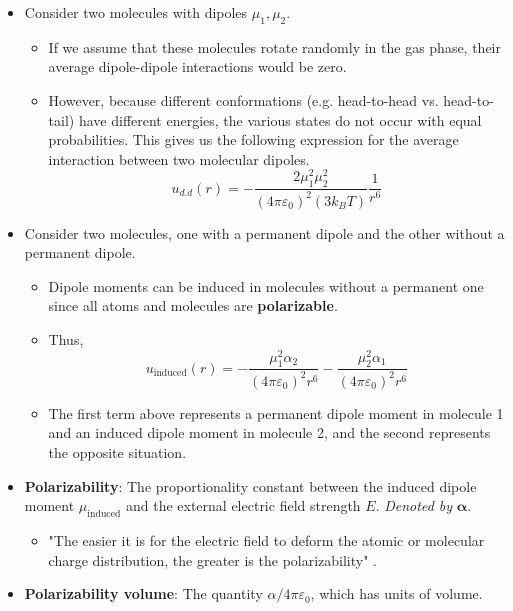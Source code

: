 \documentclass[../notes.tex]{subfiles}
\begin{document}
\begin{itemize}
    \item Consider two molecules with dipoles $\mu_1,\mu_2$.
    \begin{itemize}
        \item If we assume that these molecules rotate randomly in the gas phase, their average dipole-dipole interactions would be zero.
        \item However, because different conformations (e.g. head-to-head vs. head-to-tail) have different energies, the various states do not occur with equal probabilities. This gives us the following expression for the average interaction between two molecular dipoles.
        \begin{equation*}
            u_{d.d}(r) = -\frac{2\mu_1^2\mu_2^2}{(4\pi\varepsilon_0)^2(3k_BT)}\frac{1}{r^6}
        \end{equation*}
    \end{itemize}
    \item Consider two molecules, one with a permanent dipole and the other without a permanent dipole.
    \begin{itemize}
        \item Dipole moments can be induced in molecules without a permanent one since all atoms and molecules are \textbf{polarizable}.
        \item Thus,
        \begin{equation*}
            u_\text{induced}(r) = -\frac{\mu_1^2\alpha_2}{(4\pi\varepsilon_0)^2r^6}-\frac{\mu_2^2\alpha_1}{(4\pi\varepsilon_0)^2r^6}
        \end{equation*}
        \item The first term above represents a permanent dipole moment in molecule 1 and an induced dipole moment in molecule 2, and the second represents the opposite situation.
    \end{itemize}
    \item \textbf{Polarizability}: The proportionality constant between the induced dipole moment $\mu_\text{induced}$ and the external electric field strength $E$. \emph{Denoted by} $\bm{\alpha}$.
    \begin{itemize}
        \item "The easier it is for the electric field to deform the atomic or molecular charge distribution, the greater is the polarizability" \parencite[667-68]{bib:McQuarrieSimon}.
    \end{itemize}
    \item \textbf{Polarizability volume}: The quantity $\alpha/4\pi\varepsilon_0$, which has units of volume.

\end{itemize}
\end{document}
